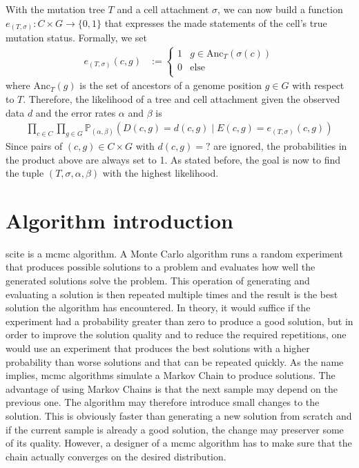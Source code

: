 With the mutation tree $T$ and a cell attachment $\sigma$, we can now build a function $e_{(T, \sigma)}: C \times G \rightarrow \{0, 1\}$ that expresses the made statements of the cell's true mutation status. Formally, we set
\begin{align*}
    e_{(T, \sigma)}(c, g) &:= \begin{cases}
        1 & g \in \mathrm{Anc}_T(\sigma(c)) \\
        0 & \text{else} \\
    \end{cases}
\end{align*}
where $\mathrm{Anc}_T(g)$ is the set of ancestors of a genome position $g \in G$ with respect to $T$. Therefore, the likelihood of a tree and cell attachment given the observed data $d$ and the error rates $\alpha$ and $\beta$ is
\begin{align*}
    \prod_{c \in C}\prod_{g \in G} \mathbb{P}_{(\alpha, \beta)}(D(c, g) = d(c, g) \mid E(c, g) = e_{(T, \sigma)}(c, g))
\end{align*}
Since pairs of $(c, g) \in C \times G$ with $d(c, g) = ?$ are ignored, the probabilities in the product above are always set to 1. As stated before, the goal is now to find the tuple $(T, \sigma, \alpha, \beta)$ with the highest likelihood.

\section{Algorithm introduction}

\ac{scite} is a \ac{mcmc} algorithm. A Monte Carlo algorithm runs a random experiment that produces possible solutions to a problem and evaluates how well the generated solutions solve the problem. This operation of generating and evaluating a solution is then repeated multiple times and the result is the best solution the algorithm has encountered. In theory, it would suffice if the experiment had a probability greater than zero to produce a good solution, but in order to improve the solution quality and to reduce the required repetitions, one would use an experiment that produces the best solutions with a higher probability than worse solutions and that can be repeated quickly. As the name implies, \ac{mcmc} algorithms simulate a Markov Chain to produce solutions. The advantage of using Markov Chains is that the next sample may depend on the previous one. The algorithm may therefore introduce small changes to the solution. This is obviously faster than generating a new solution from scratch and if the current sample is already a good solution, the change may preserver some of its quality. However, a designer of a \ac{mcmc} algorithm has to make sure that the chain actually converges on the desired distribution.